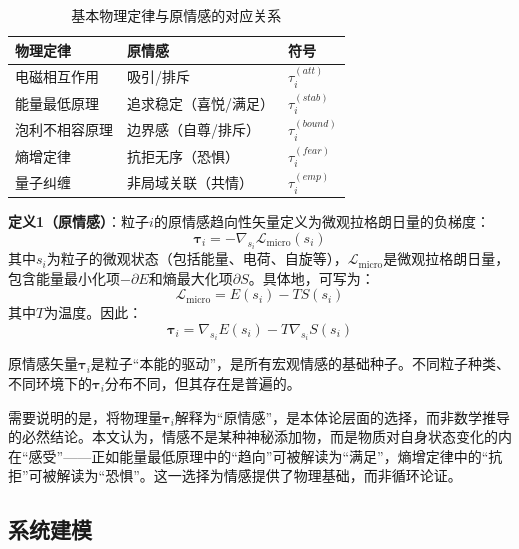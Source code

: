 \documentclass[12pt,a4paper]{article}
\theoremstyle{plain}
\newcommand{\ve}[1]{\bm{#1}}                    %
\begin{document}
\begin{table}[h]
\centering
\caption{基本物理定律与原情感的对应关系}
\begin{tabular}{lll}
\toprule
\textbf{物理定律} & \textbf{原情感} & \textbf{符号} \\
\midrule
电磁相互作用 & 吸引/排斥 & $\tau_i^{(att)}$ \\
能量最低原理 & 追求稳定（喜悦/满足） & $\tau_i^{(stab)}$ \\
泡利不相容原理 & 边界感（自尊/排斥） & $\tau_i^{(bound)}$ \\
熵增定律 & 抗拒无序（恐惧） & $\tau_i^{(fear)}$ \\
量子纠缠 & 非局域关联（共情） & $\tau_i^{(emp)}$ \\
\bottomrule
\end{tabular}
\end{table}

\textbf{定义1（原情感）}：粒子$i$的原情感趋向性矢量定义为微观拉格朗日量的负梯度：
\begin{equation}
\ve{\tau}_i = -\nabla_{s_i} \mathcal{L}_{\text{micro}}(s_i)
\end{equation}
其中$s_i$为粒子的微观状态（包括能量、电荷、自旋等），$\mathcal{L}_{\text{micro}}$是微观拉格朗日量，包含能量最小化项$- \partial E$和熵最大化项$\partial S$。具体地，可写为：
\begin{equation}
\mathcal{L}_{\text{micro}} = E(s_i) - T S(s_i)
\end{equation}
其中$T$为温度。因此：
\begin{equation}
\ve{\tau}_i = \nabla_{s_i} E(s_i) - T \nabla_{s_i} S(s_i)
\end{equation}

原情感矢量$\ve{\tau}_i$是粒子“本能的驱动”，是所有宏观情感的基础种子。不同粒子种类、不同环境下的$\ve{\tau}_i$分布不同，但其存在是普遍的。

需要说明的是，将物理量$\ve{\tau}_i$解释为“原情感”，是本体论层面的选择，而非数学推导的必然结论。本文认为，情感不是某种神秘添加物，而是物质对自身状态变化的内在“感受”——正如能量最低原理中的“趋向”可被解读为“满足”，熵增定律中的“抗拒”可被解读为“恐惧”。这一选择为情感提供了物理基础，而非循环论证。

\subsection{系统建模}
\end{document}
